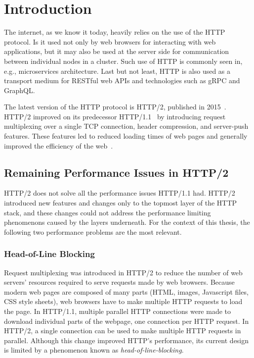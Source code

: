 \chapter{Introduction}

The internet, as we know it today, heavily relies on the use of the HTTP protocol. Is it used not
only by web browsers for interacting with web applications, but it may also be used at the server
side for communication between individual nodes in a cluster. Such use of HTTP is commonly seen in,
e.g., microservices architecture. Last but not least, HTTP is also used as a transport medium for
RESTful web APIs and technologies such as gRPC and GraphQL.

The latest version of the HTTP protocol is HTTP/2, published in 2015~\cite{rfc7540}. HTTP/2 improved
on its predecessor HTTP/1.1~\cite{rfc7230} by introducing request multiplexing over a single TCP
connection, header compression, and server-push features. These features led to reduced loading
times of web pages and generally improved the efficiency of the web~\cite{deSaxce2015}.

\section{Remaining Performance Issues in HTTP/2}

HTTP/2 does not solve all the performance issues HTTP/1.1 had. HTTP/2 introduced new features and
changes only to the topmost layer of the HTTP stack, and these changes could not address the
performance limiting phenomenons caused by the layers underneath. For the context of this thesis,
the following two performance problems are the most relevant.

\subsection*{Head-of-Line Blocking}

Request multiplexing was introduced in HTTP/2 to reduce the number of web servers' resources
required to serve requests made by web browsers. Because modern web pages are composed of many parts
(HTML, images, Javascript files, CSS style sheets), web browsers have to make multiple HTTP requests
to load the page. In HTTP/1.1, multiple parallel HTTP connections were made to download individual
parts of the webpage, one connection per HTTP request. In HTTP/2, a single connection can be used to
make multiple HTTP requests in parallel. Although this change improved HTTP's performance, its
current design is limited by a phenomenon known as \textit{\gls{head-of-line-blocking}}.

